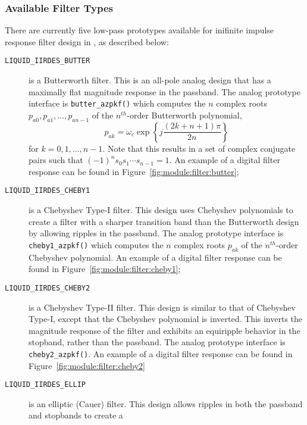 \subsubsection{Available Filter Types}
\label{module:filter:iirdes:types}
There are currently five low-pass prototypes available for inifinite impulse
response filter design in \liquid, as described below:
%
\begin{description}
\item[{\tt LIQUID\_IIRDES\_BUTTER}]
    is a Butterworth filter.
    This is an all-pole analog design that has a maximally flat magnitude
    response in the passband.
    The analog prototype interface is {\tt butter\_azpkf()} which
    computes the $n$ complex roots $p_{a0},p_{a1},\ldots,p_{an-1}$
    of the $n^{th}$-order Butterworth polynomial,
    \begin{equation}
    \label{eqn:filter:iirdes:butter}
        p_{ak} =
            \omega_c \exp\left\{
                j \frac{\left(2k+n+1\right)\pi}{2n}
            \right\}
    \end{equation}
    for $k=0,1,\ldots,n-1$.
    Note that this results in a set of complex conjugate pairs such that
    $(-1)^n s_0 s_1 \cdots s_{n-1} = 1$.
    An example of a digital filter response can be found in
    Figure~\ref{fig:module:filter:butter};
\item[{\tt LIQUID\_IIRDES\_CHEBY1}]
    is a Chebyshev Type-I filter.
    This design uses Chebyshev polynomials to create a filter with a sharper
    transition band than the Butterworth design by allowing ripples in the
    passband.
    The analog prototype interface is {\tt cheby1\_azpkf()} which
    computes the $n$ complex roots $p_{ak}$ of the $n^{th}$-order
    Chebyshev polynomial.
    An example of a digital filter response can be found in
    Figure~\ref{fig:module:filter:cheby1};
\item[{\tt LIQUID\_IIRDES\_CHEBY2}]
    is a Chebyshev Type-II filter.
    This design is similar to that of Chebyshev Type-I, except that the
    Chebyshev polynomial is inverted.
    This inverts the magnitude response of the filter and exhibits an
    equiripple behavior in the stopband, rather than the passband.
    The analog prototype interface is {\tt cheby2\_azpkf()}.
    An example of a digital filter response can be found in
    Figure~\ref{fig:module:filter:cheby2}
\item[{\tt LIQUID\_IIRDES\_ELLIP}]
    is an elliptic (Cauer) filter.
    This design allows ripples in both the passband and stopbands to create a

\end{description}

